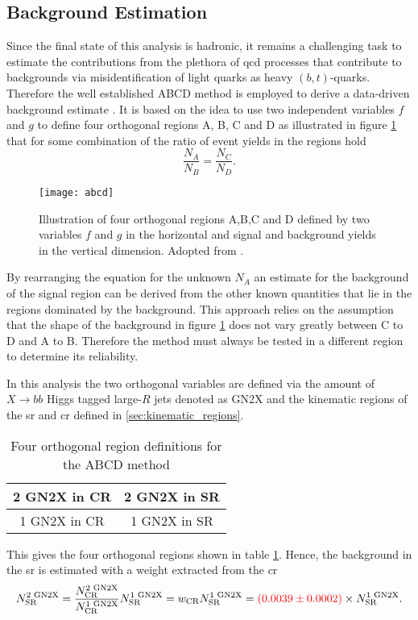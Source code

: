 \subsection{Background Estimation}\label{sec:abcd}
Since the final state of this analysis is hadronic, it remains a challenging task to estimate the contributions from the plethora of \ac{qcd} processes that contribute to backgrounds via  misidentification of light quarks as heavy $(b, t)$-quarks. Therefore the well established ABCD method is employed to derive a data-driven background estimate \citep{buttinger2018background,PhysRevD.103.035021}. It is based on the idea to use two independent variables $f$ and $g$ to define four orthogonal regions A, B, C and D as illustrated in figure \ref{fig:abcd} that for some combination of the ratio of event yields in the regions hold
\begin{equation}
    \frac{N_A}{N_B}=\frac{N_C}{N_D}.
\end{equation}
\begin{figure}
    \centering
    \texttt{[image: abcd]}
    \caption[]{Illustration of four orthogonal regions A,B,C and D defined by two variables $f$ and $g$ in the horizontal and signal and background yields in the vertical dimension. Adopted from \citep{PhysRevD.103.035021}.}
    \label{fig:abcd}
\end{figure}
By rearranging the equation for the unknown $N_A$ an estimate for the background of the signal region can be derived from the other known quantities that lie in the regions dominated by the background. This approach relies on the assumption that the shape of the background in figure \ref{fig:abcd} does not vary greatly between C to D and A to B. Therefore the method must always be tested in a different region to determine its reliability.


In this analysis the two orthogonal variables are defined via the amount of $X\rightarrow bb$ Higgs tagged large-$R$ jets denoted as GN2X and the kinematic regions of the \ac{sr} and \ac{cr} defined in \ref{sec:kinematic_regions}.
\begin{table}[htbp]
    \centering
    \caption{Four orthogonal region definitions for the ABCD method}
    \begin{tabular}{|c|c|}
        \hline
        2 GN2X in CR & 2 GN2X in SR \\ \hline
        1 GN2X in CR & 1 GN2X in SR \\ \hline
    \end{tabular}
    \label{tab:abcd}
\end{table}
This gives the four orthogonal regions shown in table \ref{tab:abcd}. Hence, the background in the \ac{sr} is estimated with a weight extracted from the \ac{cr}
\begin{equation}
    N_\text{SR}^\text{2 GN2X}=\frac{N_\text{CR}^\text{2 GN2X}}{N_\text{CR}^\text{1 GN2X}} N_\text{SR}^\text{1 GN2X} = w_\text{CR} N_\text{SR}^\text{1 GN2X}=  \textcolor{red}{(0.0039 \pm 0.0002)} \times N_\text{SR}^\text{1 GN2X}.
\end{equation}


